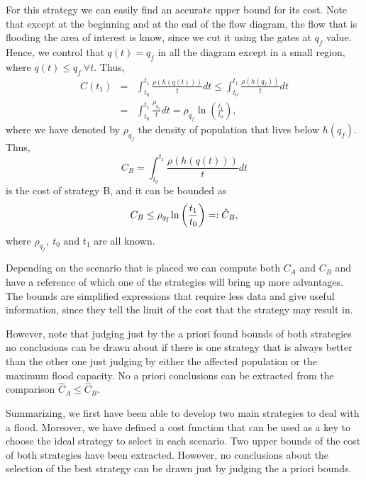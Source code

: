 \begin{description}
\noindent
For this strategy we can easily find an accurate upper bound for its cost. Note that except at the beginning and at the end of the flow diagram, the flow that is flooding the area of interest is know, since we cut it using the gates at $q_f$ value. Hence, we control that $q(t)=q_f$ in all the diagram except in a small region, where $q(t)\leq q_f\ \forall t$. Thus,
\begin{eqnarray*}
C(t_1)&=&\int_{t_0}^{t_1}\frac{\rho(h(q(t)))}{t}dt \leq \int_{t_0}^{t_1}\frac{\rho(h(q_f))}{t}dt\\
&=&\int_{t_0}^{t_1}\frac{\rho_{q_f}}{t}dt=\rho_{q_f} \ln\left(\frac{t_1}{t_0}\right),
\end{eqnarray*}
where we have denoted by ${\rho_{q_f}}$ the density of population that lives below $h(q_f)$.
\newline
Thus,
\begin{equation}
C_B=\int_{t_0}^{t_1}\frac{\rho(h(q(t)))}{t}dt
\label{costB}
\end{equation}
is the cost of strategy B, and it can be bounded as
\begin{equation}
C_B \leq \rho_{q_{\mbox{\scriptsize f}}}\ln\left(\frac{t_1}{t_0}\right) =: \hat{C}_B,
\label{CB}
\end{equation} 
where $\rho_{q_f},\ t_0 \text{ and } t_1$ are all known.

\end{description}

Depending on the scenario that is placed we can compute both $C_A$ and $C_B$ and have a reference of which one of the strategies will bring up more advantages. The bounds are simplified expressions that require less data and give useful information, since they tell the limit of the cost that the strategy may result in. 

However, note that judging just by the a priori found bounds of both strategies no conclusions can be drawn about if there is one strategy that is always better than the other one just judging by either the affected population or the maximum flood capacity. No a priori conclusions can be extracted from the comparison $\hat{C}_A \leq \hat{C}_B$.

Summarizing, we first have been able to develop two main strategies to deal with a flood. Moreover, we have defined a cost function that can be used as a key to choose the ideal strategy to select in each scenario. Two upper bounds of the cost of both strategies have been extracted. However, no conclusions about the selection of the best strategy can be drawn just by judging the a priori bounds.

